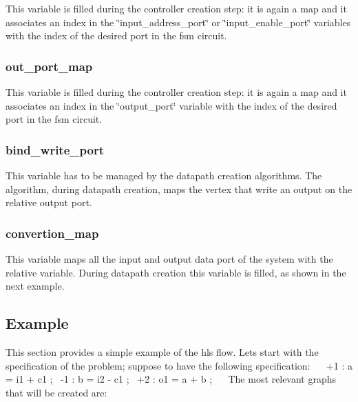 This variable is filled during the controller creation step\+: it is again a map and it associates an index in the \char`\"{}input\+\_\+address\+\_\+port\char`\"{} or \char`\"{}input\+\_\+enable\+\_\+port\char`\"{} variables with the index of the desired port in the fsm circuit. \hypertarget{src_HLS_page_out_port_map}{}\subsubsection{out\+\_\+port\+\_\+map}\label{src_HLS_page_out_port_map}
This variable is filled during the controller creation step\+: it is again a map and it associates an index in the \char`\"{}output\+\_\+port\char`\"{} variable with the index of the desired port in the fsm circuit. \hypertarget{src_HLS_page_bind_write_port}{}\subsubsection{bind\+\_\+write\+\_\+port}\label{src_HLS_page_bind_write_port}
This variable has to be managed by the datapath creation algorithms. The algorithm, during datapath creation, maps the vertex that write an output on the relative output port. \hypertarget{src_HLS_page_convertion_map}{}\subsubsection{convertion\+\_\+map}\label{src_HLS_page_convertion_map}
This variable maps all the input and output data port of the system with the relative variable. During datapath creation this variable is filled, as shown in the next example. \hypertarget{src_HLS_page_src_HLS_data_strucutre_example}{}\subsection{Example}\label{src_HLS_page_src_HLS_data_strucutre_example}
This section provides a simple example of the hls flow. Lets start with the specification of the problem; suppose to have the following specification\+:~\newline
~\newline
 +1 \+: a = i1 + c1 ;~\newline
 -\/1 \+: b = i2 -\/ c1 ;~\newline
 +2 \+: o1 = a + b ;~\newline
~\newline
 The most relevant graphs that will be created are\+:
